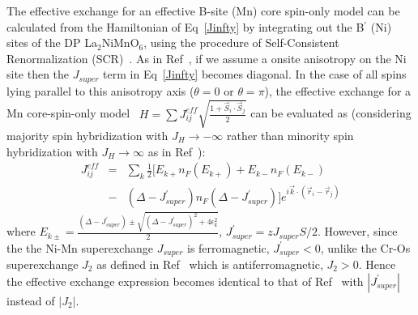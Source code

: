 \documentclass[english,aps,prb,twocolumn,showpacs]{revtex4-1}
\begin{document}
The effective exchange for an effective B-site (Mn) core spin-only model can be calculated 
from the Hamiltonian of Eq~\ref{Jinfty}  by integrating out the B$^{\prime}$ (Ni) sites of the DP La$_{2}$NiMnO$_{6}$, 
 using the procedure of Self-Consistent Renormalization (SCR)~\cite{PinakiSCR,mePinaki}.
 As in Ref~\cite{Sr2CrOsO6}, if we
assume a onsite anisotropy on the Ni site then the $J_{super}$ term in Eq~\ref{Jinfty} becomes diagonal. In the case 
 of all spins lying parallel to this anisotropy axis ($\theta=0$ or $\theta=\pi$), the effective exchange for a
 Mn core-spin-only model~\cite{mePinaki,Sr2CrOsO6}
 $H=\sum J_{ij}^{eff}\sqrt{\frac{1+\vec{S}_{i}\cdot\vec{S}_{j}}{2}}$ can be 
evaluated as (considering majority spin hybridization with $J_{H}\rightarrow-\infty$ rather than minority spin 
 hybridization with $J_{H}\rightarrow\infty$ as in Ref~\cite{Sr2CrOsO6}):
\begin{eqnarray}
J_{ij}^{eff}&=&\sum_{k}\frac{1}{2}[E_{k+}n_{F}(E_{k+})+E_{k-}n_{F}(E_{k-}) \nonumber \\
&-&(\Delta-J^{\prime}_{super})n_{F}(\Delta-J^{\prime}_{super})]e^{i\vec{k}\cdot(\vec{r}_{i}-\vec{r}_{j})}
\label{effexchange}
\end{eqnarray} 
where $E_{k\pm}=\frac{(\Delta-J^{\prime}_{super})\pm\sqrt{(\Delta-J^{\prime}_{super})^{2}+4\epsilon_{k}^{2}}}{2}$, $J_{super}^{\prime}=zJ_{super}S/2$. However, since the 
 the Ni-Mn superexchange $J_{super}$  is ferromagnetic, $J^{\prime}_{super}<0$, unlike the Cr-Os superexchange $J_{2}$ as defined
 in Ref~\cite{Sr2CrOsO6} which is antiferromagnetic, $J_{2}>0$. 
  Hence the effective exchange expression becomes identical 
 to that of Ref~\cite{Sr2CrOsO6} with $|J^{\prime}_{super}|$ instead of $|J_{2}|$. 
\end{document}
